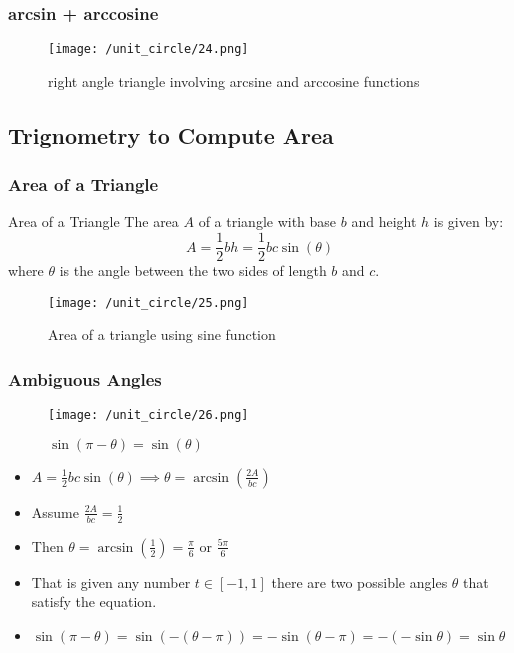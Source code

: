 \begin{frame}
    \frametitle{arcsin + arccosine}
    \begin{figure}
        \centering
        \texttt{[image: /unit\_circle/24.png]}
        \caption{right angle triangle involving arcsine and arccosine functions}      
    \end{figure}
\end{frame}

\subsection{Trignometry to Compute Area}

\begin{frame}
    \frametitle{Area of a Triangle}
    \begin{block}{Area of a Triangle}
        The area \(A\) of a triangle with base \(b\) and height \(h\) is given by:
        \[
        A = \frac{1}{2} b h = \frac{1}{2} b c \sin(\theta)
        \]
        where \(\theta\) is the angle between the two sides of length \(b\) and \(c\).
    \end{block}
    \begin{figure}
        \centering
        \texttt{[image: /unit\_circle/25.png]}
        \caption{Area of a triangle using sine function}
    \end{figure}
\end{frame}

\begin{frame}
    \frametitle{Ambiguous Angles}
    \begin{figure}
        \centering
        \texttt{[image: /unit\_circle/26.png]}
        \caption{\(\sin(\pi - \theta) = \sin(\theta)\)}
    \end{figure}
    \begin{itemize}
        \item  \(A = \frac{1}{2} b c \sin(\theta) \implies \theta = \arcsin\left(\frac{2A}{bc}\right) \)
        \item Assume \( \frac{2A}{bc} = \frac{1}{2} \) 
        \item Then \( \theta = \arcsin\left(\frac{1}{2}\right) = \frac{\pi}{6} \) or \( \frac{5\pi}{6} \)
        \item That is given any number \(t \in [-1,1]\) there are two possible angles \(\theta\) that satisfy the equation.
        \item \(\sin (\pi - \theta) = \sin(-(\theta - \pi )) = - \sin(\theta - \pi) = -(-\sin \theta) = \sin \theta \)
    \end{itemize}
    \end{frame}

